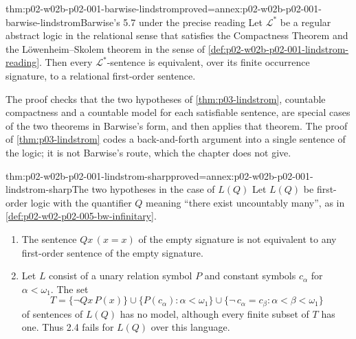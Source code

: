 \begin{hbcorollary}{thm:p02-w02b-p02-001-barwise-lindstrom}{proved=annex:p02-w02b-p02-001-barwise-lindstrom}{Barwise's 5.7 under the precise reading}
Let \(\mathcal L^{\ast}\) be a regular abstract logic in the relational
sense that satisfies the Compactness Theorem and the L\"owenheim--Skolem
theorem in the sense of \cref{def:p02-w02b-p02-001-lindstrom-reading}.
Then every \(\mathcal L^{\ast}\)-sentence is equivalent, over its finite
occurrence signature, to a relational first-order sentence.
\end{hbcorollary}

The proof checks that the two hypotheses of \cref{thm:p03-lindstrom},
countable compactness and a countable model for each satisfiable sentence,
are special cases of the two theorems in Barwise's form, and then applies
that theorem.  The proof of \cref{thm:p03-lindstrom} codes a
back-and-forth argument into a single sentence of the logic; it is not
Barwise's route, which the chapter does not give.

\begin{hblemma}{thm:p02-w02b-p02-001-lindstrom-sharp}{proved=annex:p02-w02b-p02-001-lindstrom-sharp}{The two hypotheses in the case of \(L(Q)\)}
Let \(L(Q)\) be first-order logic with the quantifier \(Q\) meaning
``there exist uncountably many'', as in
\cref{def:p02-w02-p02-005-bw-infinitary}.
\begin{enumerate}
\item The sentence \(Qx\,(x=x)\) of the empty signature is not equivalent
      to any first-order sentence of the empty signature.
\item Let \(L\) consist of a unary relation symbol \(P\) and constant
      symbols \(c_\alpha\) for \(\alpha<\omega_1\).  The set
      \[
       T=\{\neg Qx\,P(x)\}\cup\{P(c_\alpha):\alpha<\omega_1\}
         \cup\{\neg\, c_\alpha=c_\beta:\alpha<\beta<\omega_1\}
      \]
      of sentences of \(L(Q)\) has no model, although every finite subset
      of \(T\) has one.  Thus 2.4 fails for \(L(Q)\) over this language.
\end{enumerate}
\end{hblemma}

